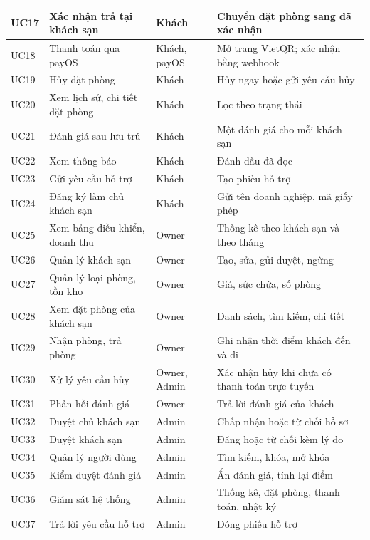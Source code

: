 \begin{rtable}
\begin{longtable}{|C{1.2cm}|L{5.4cm}|L{2.5cm}|L{5.6cm}|}
UC17 & Xác nhận trả tại khách sạn & Khách & Chuyển đặt phòng sang đã xác nhận \\ \hline
UC18 & Thanh toán qua payOS & Khách, payOS & Mở trang VietQR; xác nhận bằng webhook \\ \hline
UC19 & Hủy đặt phòng & Khách & Hủy ngay hoặc gửi yêu cầu hủy \\ \hline
UC20 & Xem lịch sử, chi tiết đặt phòng & Khách & Lọc theo trạng thái \\ \hline
UC21 & Đánh giá sau lưu trú & Khách & Một đánh giá cho mỗi khách sạn \\ \hline
UC22 & Xem thông báo & Khách & Đánh dấu đã đọc \\ \hline
UC23 & Gửi yêu cầu hỗ trợ & Khách & Tạo phiếu hỗ trợ \\ \hline
UC24 & Đăng ký làm chủ khách sạn & Khách & Gửi tên doanh nghiệp, mã giấy phép \\ \hline
UC25 & Xem bảng điều khiển, doanh thu & Owner & Thống kê theo khách sạn và theo tháng \\ \hline
UC26 & Quản lý khách sạn & Owner & Tạo, sửa, gửi duyệt, ngừng \\ \hline
UC27 & Quản lý loại phòng, tồn kho & Owner & Giá, sức chứa, số phòng \\ \hline
UC28 & Xem đặt phòng của khách sạn & Owner & Danh sách, tìm kiếm, chi tiết \\ \hline
UC29 & Nhận phòng, trả phòng & Owner & Ghi nhận thời điểm khách đến và đi \\ \hline
UC30 & Xử lý yêu cầu hủy & Owner, Admin & Xác nhận hủy khi chưa có thanh toán trực tuyến \\ \hline
UC31 & Phản hồi đánh giá & Owner & Trả lời đánh giá của khách \\ \hline
UC32 & Duyệt chủ khách sạn & Admin & Chấp nhận hoặc từ chối hồ sơ \\ \hline
UC33 & Duyệt khách sạn & Admin & Đăng hoặc từ chối kèm lý do \\ \hline
UC34 & Quản lý người dùng & Admin & Tìm kiếm, khóa, mở khóa \\ \hline
UC35 & Kiểm duyệt đánh giá & Admin & Ẩn đánh giá, tính lại điểm \\ \hline
UC36 & Giám sát hệ thống & Admin & Thống kê, đặt phòng, thanh toán, nhật ký \\ \hline
UC37 & Trả lời yêu cầu hỗ trợ & Admin & Đóng phiếu hỗ trợ \\ \hline
\end{longtable}
\end{rtable}

